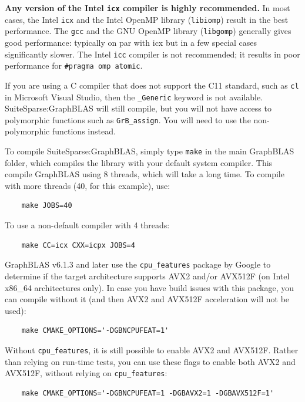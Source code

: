 {\bf Any version of the Intel \verb'icx' compiler is highly recommended.} In
most cases, the Intel \verb'icx' and the Intel OpenMP library (\verb'libiomp')
result in the best performance.  The \verb'gcc' and the GNU OpenMP library
(\verb'libgomp') generally gives good performance: typically on par with icx
but in a few special cases significantly slower.  The Intel \verb'icc' compiler
is not recommended; it results in poor performance for
\verb'#pragma omp atomic'.

If you are using a C compiler that does not support the C11 standard, such as
\verb'cl' in Microsoft Visual Studio, then the \verb'_Generic' keyword is not
available.  SuiteSparse:GraphBLAS will still compile, but you will not have
access to polymorphic functions such as \verb'GrB_assign'.  You will need to
use the non-polymorphic functions instead.

To compile SuiteSparse:GraphBLAS, simply type \verb'make' in the main GraphBLAS
folder, which compiles the library with your default system compiler.  This
compile GraphBLAS using 8 threads, which will take a long time.  To compile with
more threads (40, for this example), use:

    {\small
    \begin{verbatim}
    make JOBS=40 \end{verbatim} }

To use a non-default compiler with 4 threads:

    {\small
    \begin{verbatim}
    make CC=icx CXX=icpx JOBS=4 \end{verbatim} }

GraphBLAS v6.1.3 and later use the \verb'cpu_features' package by Google to
determine if the target architecture supports AVX2 and/or AVX512F (on Intel
x86\_64 architectures only).  In case you have build issues with this package,
you can compile without it (and then AVX2 and AVX512F acceleration will not
be used):

    {\small
    \begin{verbatim}
    make CMAKE_OPTIONS='-DGBNCPUFEAT=1'  \end{verbatim} }

Without \verb'cpu_features', it is still possible to enable AVX2 and AVX512F.
Rather than relying on run-time tests, you can use these flags to enable
both AVX2 and AVX512F, without relying on \verb'cpu_features':

    {\small
    \begin{verbatim}
    make CMAKE_OPTIONS='-DGBNCPUFEAT=1 -DGBAVX2=1 -DGBAVX512F=1' \end{verbatim} }

